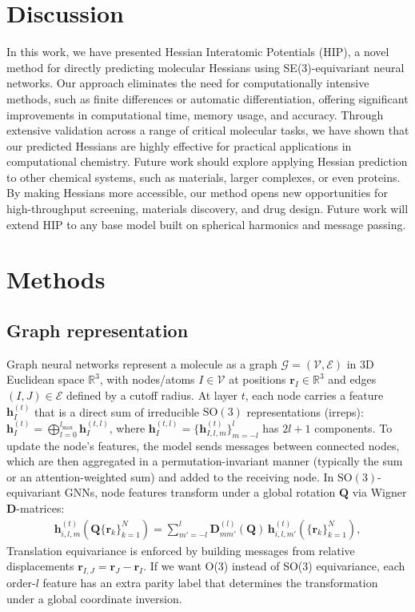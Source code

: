\documentclass[pdflatex,sn-mathphys-num]{sn-jnl}%
\theoremstyle{thmstyleone}%
\theoremstyle{thmstyletwo}%
\theoremstyle{thmstylethree}%
\begin{document}
\section{Discussion}
In this work, we have presented Hessian Interatomic Potentials (HIP), a novel method for directly predicting molecular Hessians using SE(3)-equivariant neural networks. Our approach eliminates the need for computationally intensive methods, such as finite differences or automatic differentiation, offering significant improvements in computational time, memory usage, and accuracy.
Through extensive validation across a range of critical molecular tasks, 
we have shown that our predicted Hessians are highly effective for practical applications in computational chemistry.  
Future work should explore applying Hessian prediction to other chemical systems, such as materials, larger complexes, or even proteins.
By making Hessians more accessible, our method opens new opportunities for high-throughput screening, materials discovery, and drug design. Future work will extend HIP to any base model built on spherical harmonics and message passing.



\section{Methods}

\subsection{Graph representation}
Graph neural networks represent a molecule as a graph $\mathcal{G}=(\mathcal{V},\mathcal{E})$ in 3D Euclidean space $\mathbb{R}^3$, with nodes/atoms $I\in\mathcal{V}$ at positions $\mathbf{r}_I\in\mathbb{R}^3$ and edges $(I,J)\in\mathcal{E}$ defined by a cutoff radius. At layer $t$, each node carries a feature $\mathbf{h}_I^{(t)}$ that is a direct sum of irreducible $\mathrm{SO}(3)$ representations (irreps): $\mathbf{h}_I^{(t)}=\bigoplus_{l=0}^{l_{\max}}\mathbf{h}_{I}^{(t,l)}$, where $\mathbf{h}_{I}^{(t,l)}=\{\mathbf{h}^{(t)}_{I,l,m}\}_{m=-l}^{l}$ has $2l+1$ components. To update the node's features, the model sends messages between connected nodes, which are then aggregated in a permutation-invariant manner (typically the sum or an attention-weighted sum) and added to the receiving node.
In $\mathrm{SO}(3)$-equivariant GNNs, node features transform under a global rotation $\mathbf{Q}$ via Wigner $\mathbf{D}$-matrices:
\begin{align}
\mathbf{h}^{(t)}_{i,l,m}\!\left(\mathbf{Q}\{\mathbf{r}_k\}_{k=1}^N\right)
= \sum_{m'=-l}^{l} \mathbf{D}^{(l)}_{m m'}(\mathbf{Q})\,\mathbf{h}^{(t)}_{i,l,m'}\!\left(\{\mathbf{r}_k\}_{k=1}^N\right),
\label{eq:so3-transform}
\end{align}
Translation equivariance is enforced by building messages from relative displacements $\mathbf{r}_{I,J}=\mathbf{r}_J-\mathbf{r}_I$. If we want O(3) instead of SO(3) equivariance, each order-$l$ feature has an extra parity label that determines the transformation under a global coordinate inversion.
\end{document}
